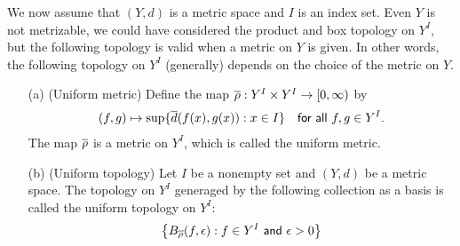We now assume that $(Y, d)$ is a metric space and $I$ is an index set.
Even $Y$ is not metrizable, we could have considered the product and box topology on $Y^I$, but the following topology is valid when a metric on $Y$ is given.
In other words, the following topology on $Y^I$ (generally) depends on the choice of the metric on $Y$.
\begin{defi}
    \begin{enumerate}
        \item[(a)]
        {
            (Uniform metric)
            Define the map $\overline{\rho}: Y^I\times Y^I\rightarrow [0,\infty)$ by
            \begin{align*}
                (f, g)\mapsto\sup\{\overline{d}(f(x), g(x)): x\in I\}
                \quad
                \textsf{for all $f, g\in Y^I$.}
            \end{align*}
            The map $\overline{\rho}$ is a metric on $Y^I$, which is called the uniform metric.
        }
        \item[(b)]
        {
            (Uniform topology)
            Let $I$ be a nonempty set and $(Y, d)$ be a metric space.
            The topology on $Y^I$ generaged by the following collection as a basis is called the uniform topology on $Y^I$:
            \begin{align*}
                \left\{
                    B_{\overline{\rho}}(f, \epsilon):
                    \textsf{$f\in Y^I$ and $\epsilon>0$}
                \right\}
            \end{align*}
        }
    \end{enumerate}
\end{defi}

